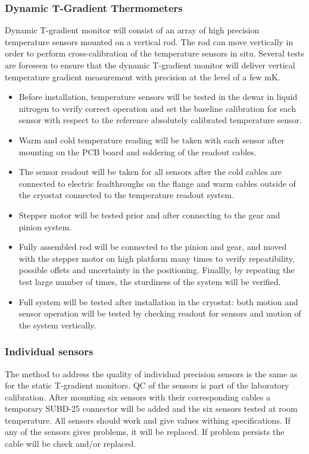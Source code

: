\subsubsection{Dynamic T-Gradient Thermometers}
\label{sec:fdsp-slow-cryo-qc-thdy}

Dynamic T-gradient monitor will consist of an array of high precision temperature sensors mounted on a vertical rod. The rod can move vertically in order to perform cross-calibration of the temperature sensors in situ. Several tests are foreseen to ensure that the dynamic T-gradient monitor will deliver vertical temperature gradient measurement with precision at the level of a few mK.

\begin{itemize}
\item
Before installation, temperature sensors will be tested in the dewar in liquid nitrogen to verify correct operation and set the baseline calibration for each sensor with respect to the reference absolutely calibrated temperature sensor.
\item
Warm and cold temperature reading will be taken with each sensor after mounting on the PCB board and soldering of the readout cables.
\item
The sensor readout will be taken for all sensors after the cold cables are connected to electric feadthroughs on the flange and warm cables outside of the cryostat connected to the temperature readout system.
\item 
Stepper motor will be tested prior and after connecting to the gear and pinion system.
\item
Fully assembled rod will be connected to the pinion and gear, and moved with the stepper motor on high platform many times to verify repeatibility, possible offets and uncertainty in the positioning. Finallly, by repeating the test large number of times, the sturdiness of the system will be verified.
\item
Full system will be tested after installation in the cryostat: both motion and sensor operation will be tested by checking readout for sensors and motion of the system vertically.
\end{itemize} 

\subsubsection{Individual sensors}
\label{sec:fdsp-slow-cryo-qc-is}

The method to address the quality of individual precision sensors is the same as for the static T-gradient monitors.
QC of the sensors is part of the laboratory calibration. After mounting six sensors with their corresponding cables a
temporary SUBD-25 connector will be added and the six sensors tested at room temperature. All sensors should work and give values withing specifications.  
If any of the sensors gives problems, it will be replaced. If problem persists the cable will be check and/or replaced.

